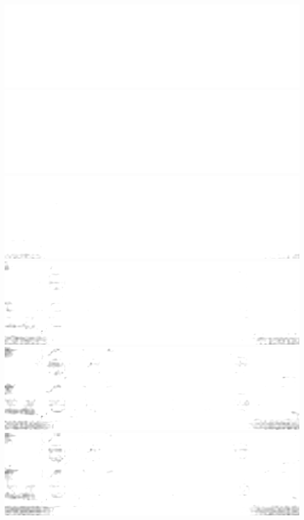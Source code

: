 \documentclass{beamer}
\begin{document}
\begin{frame}
        \includegraphics[height=0.023\textheight]{spatial-denoised/wavelet_den_49.png}
        \includegraphics[height=0.023\textheight]{spatial-denoised/wavelet_den_50.png}
        \includegraphics[height=0.023\textheight]{spatial-denoised/wavelet_den_51.png}
        \includegraphics[height=0.023\textheight]{spatial-denoised/wavelet_den_52.png}
        \includegraphics[height=0.023\textheight]{spatial-denoised/wavelet_den_53.png}
        \includegraphics[height=0.023\textheight]{spatial-denoised/wavelet_den_54.png}

\end{frame}
\end{document}
